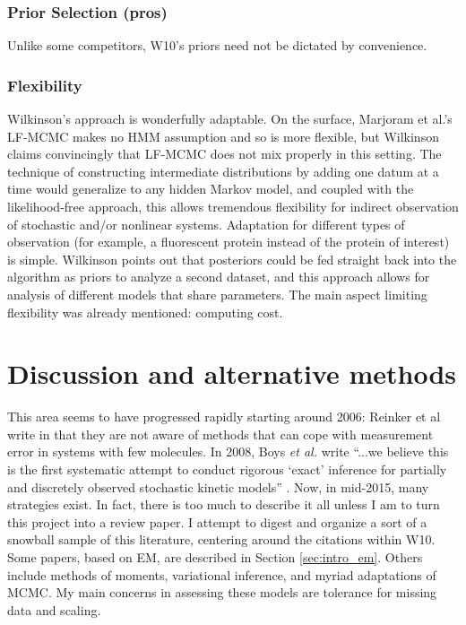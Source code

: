 \documentclass{article}
\begin{document}
\subsubsection{Prior Selection (pros)}
Unlike some competitors, W10's priors need not be dictated by convenience.

\subsubsection{Flexibility}
Wilkinson's approach is wonderfully adaptable. On the surface, Marjoram et al.'s LF-MCMC makes no HMM assumption and so is more flexible, but Wilkinson claims convincingly that LF-MCMC does not mix properly in this setting. The technique of constructing intermediate distributions by adding one datum at a time would generalize to any hidden Markov model, and coupled with the likelihood-free approach, this allows tremendous flexibility for indirect observation of stochastic and/or nonlinear systems. Adaptation for different types of observation (for example, a fluorescent protein instead of the protein of interest) is simple. Wilkinson points out that posteriors could be fed straight back into the algorithm as priors to analyze a second dataset, and this approach allows for analysis of different models that share parameters. The main aspect limiting flexibility was already mentioned: computing cost.



\section{Discussion and alternative methods}
This area seems to have progressed rapidly starting around 2006: Reinker et al write in \cite{reinker2006parameter} that they are not aware of methods that can cope with measurement error in systems with few molecules. In 2008, Boys \textit{et al.} write ``...we believe this is
the first systematic attempt to conduct rigorous `exact' inference for partially and discretely observed stochastic kinetic models'' \cite{Boys2008}. Now, in mid-2015, many strategies exist. In fact, there is too much to describe it all unless I am to turn this project into a review paper. I attempt to digest and organize a sort of a snowball sample of this literature, centering around the citations within W10. Some papers, based on EM, are described in Section \ref{sec:intro_em}. Others include methods of moments, variational inference, and myriad adaptations of MCMC. My main concerns in assessing these models are tolerance for missing data and scaling.
\end{document}
